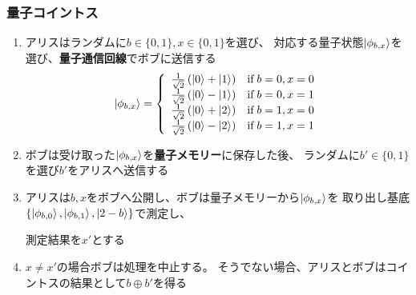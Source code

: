 \begin{frame}
  \frametitle{量子コイントス\cite{AMBAINIS2004398}}

  \begin{enumerate}
    \item アリスはランダムに$b \in \{0, 1\}, x \in \{0, 1\}$を選び、
    対応する量子状態$\ket{\phi_{b,x}}$を選び、\textbf{量子通信回線}でボブに送信する
    \[
      \ket{\phi_{b, x}} = \left\{\begin{array}{ll}
                                   \frac{1}{\sqrt{2}}\left(\ket{0} + \ket{1}\right) & \text{if}\; b = 0, x = 0 \\
                                   \frac{1}{\sqrt{2}}\left(\ket{0} - \ket{1}\right) & \text{if}\; b = 0, x = 1 \\
                                   \frac{1}{\sqrt{2}}\left(\ket{0} + \ket{2}\right) & \text{if}\; b = 1, x = 0 \\
                                   \frac{1}{\sqrt{2}}\left(\ket{0} - \ket{2}\right) & \text{if}\; b = 1, x = 1
                                \end{array}\right.
    \]
   
    \item ボブは受け取った$\ket{\phi_{b,x}}$を\textbf{量子メモリー}に保存した後、
    ランダムに$b' \in \{0, 1\}$を選び$b'$をアリスへ送信する
   
    \item アリスは$b, x$をボブへ公開し、ボブは量子メモリーから$\ket{\phi_{b,x}}$を
    取り出し基底$\{\ket{\phi_{b,0}}, \ket{\phi_{b,1}}, \ket{2 - b}\}$で測定し、

    測定結果を$x'$とする
   
    \item $x \ne x'$の場合ボブは処理を中止する。
    そうでない場合、アリスとボブはコイントスの結果として$b \oplus b'$を得る
  \end{enumerate}


\end{frame}


